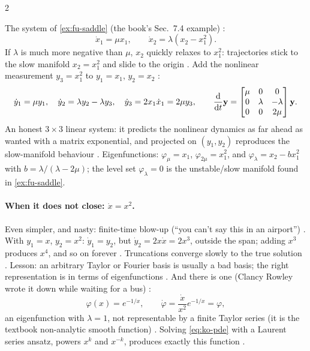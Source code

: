 \begin{paracol}{2}
\begin{casestudy}
The system of \cref{ex:fu-saddle} (the book's Sec.~7.4 example) :
\begin{equation}\label{eq:ko-slow}
  \dot x_1=\mu x_1,\qquad \dot x_2=\lambda(x_2-x_1^2).
\end{equation}
If $\lambda$ is much more negative than $\mu$, $x_2$ quickly relaxes to $x_1^2$: trajectories stick to the
slow manifold $x_2=x_1^2$ and slide to the origin . Add the nonlinear
measurement $y_3=x_1^2$ to $y_1=x_1$, $y_2=x_2$ :
\[
  \dot y_1=\mu y_1,\quad \dot y_2=\lambda y_2-\lambda y_3,\quad \dot y_3=2x_1\dot x_1=2\mu y_3,
  \qquad
  \frac{\mathrm d}{\mathrm dt}\mathbf{y}=\begin{bmatrix}\mu&0&0\\0&\lambda&-\lambda\\0&0&2\mu\end{bmatrix}\mathbf{y} .
\]
An honest $3\times3$ linear system: it predicts the nonlinear dynamics as far ahead as wanted with a matrix
exponential, and projected on $(y_1,y_2)$ reproduces the slow-manifold behaviour
. Eigenfunctions:
$\varphi_\mu=x_1$, $\varphi_{2\mu}=x_1^2$, and $\varphi_\lambda=x_2-bx_1^2$ with $b=\lambda/(\lambda-2\mu)$;
the level set $\varphi_\lambda=0$ is the unstable/slow manifold found in \cref{ex:fu-saddle}.
\end{casestudy}

\paragraph{When it does not close: $\dot x=x^2$.} Even simpler, and nasty: finite-time blow-up (``you can't
say this in an airport'') . With $y_1=x$, $y_2=x^2$: $\dot y_1=y_2$, but
$\dot y_2=2x\dot x=2x^3$, outside the span; adding $x^3$ produces $x^4$, and so on forever
. Truncations converge slowly to the true solution . Lesson: an
arbitrary Taylor or Fourier basis is usually a bad basis; the right representation is in terms of
eigenfunctions . And there is one (Clancy Rowley wrote it down while waiting for a bus)
:
\[
  \varphi(x)=e^{-1/x},\qquad \dot\varphi=\frac{\dot x}{x^2}e^{-1/x}=\varphi ,
\]
an eigenfunction with $\lambda=1$, not representable by a finite Taylor series (it is the textbook
non-analytic smooth function) . Solving \eqref{eq:ko-pde} with a Laurent series ansatz,
powers $x^k$ and $x^{-k}$, produces exactly this function .


\end{paracol}
